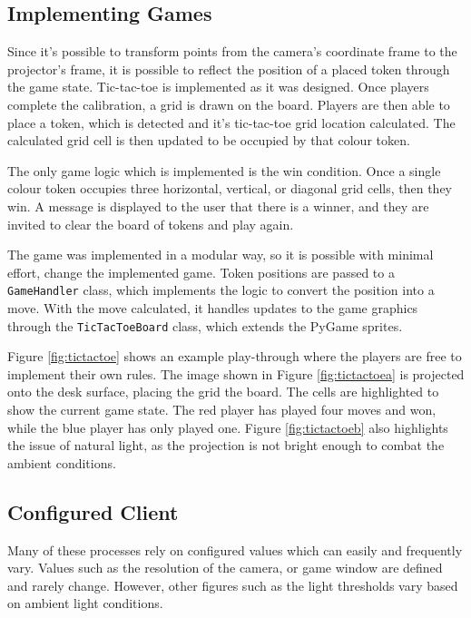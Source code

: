 \documentclass[12pt]{article}
\begin{document}
\subsection{Implementing Games}
Since it's possible to transform points from the camera's coordinate frame to the projector's frame, it is possible to reflect the position of a placed token through the game state.
Tic-tac-toe is implemented as it was designed. 
Once players complete the calibration, a grid is drawn on the board.
Players are then able to place a token, which is detected and it's tic-tac-toe grid location calculated. 
The calculated grid cell is then updated to be occupied by that colour token. 

The only game logic which is implemented is the win condition. 
Once a single colour token occupies three horizontal, vertical, or diagonal grid cells, then they win. 
A message is displayed to the user that there is a winner, and they are invited to clear the board of tokens and play again.

The game was implemented in a modular way, so it is possible with minimal effort, change the implemented game. 
Token positions are passed to a \texttt{GameHandler} class, which implements the logic to convert the position into a move. 
With the move calculated, it handles updates to the game graphics through the \texttt{TicTacToeBoard} class, which extends the PyGame sprites. 

Figure \ref{fig:tictactoe} shows an example play-through where the players are free to implement their own rules. 
The image shown in Figure \ref{fig:tictactoea} is projected onto the desk surface, placing the grid the board. The cells are highlighted to show the current game state.
The red player has played four moves and won, while the blue player has only played one. 
Figure \ref{fig:tictactoeb} also highlights the issue of natural light, as the projection is not bright enough to combat the ambient conditions. 

\subsection{Configured Client}
Many of these processes rely on configured values which can easily and frequently vary. Values such as the resolution of the camera, or game window are defined and rarely change. However, other figures such as the light thresholds vary based on ambient light conditions. 
\end{document}
